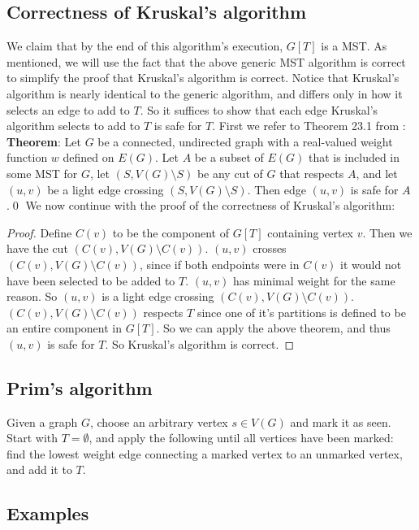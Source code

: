 \documentclass[11pt]{article}
\begin{document}
\subsection{Correctness of Kruskal's algorithm}
We claim that by the end of this algorithm's execution, $G[T]$ is a MST. As
mentioned, we will use the fact that the above generic MST algorithm is correct
to simplify the proof that Kruskal's algorithm is correct. Notice that
Kruskal's algorithm is nearly identical to the generic algorithm, and differs
only in how it selects an edge to add to $T$. So it suffices to show that each
edge Kruskal's algorithm selects to add to $T$ is safe for $T$. First we refer
to Theorem 23.1 from \cite{CLRS}:
\newline
\newline
\textbf{Theorem}: Let $G$ be a connected, undirected graph with a real-valued
weight function $w$ defined on $E(G)$. Let $A$ be a subset of $E(G)$ that is
included in some MST for $G$, let $(S,V(G)\setminus S)$ be any cut of $G$ that
respects $A$, and let $(u,v)$ be a light edge crossing $(S,V(G)\setminus S)$.
Then edge $(u,v)$ is safe for $A$.\qed
\newline
\newline
We now continue with the proof of the correctness of Kruskal's algorithm:
\begin{proof}
	Define $C(v)$ to be the component of $G[T]$ containing vertex $v$. Then we
	have the cut $(C(v),V(G)\setminus C(v))$. $(u,v)$ crosses
	$(C(v),V(G)\setminus C(v))$, since if both endpoints were in $C(v)$ it would
	not have been selected to be added to $T$. $(u,v)$ has minimal weight for
	the same reason. So $(u,v)$ is a light edge crossing
	$(C(v),V(G)\setminus C(v))$. $(C(v),V(G)\setminus C(v))$ respects $T$ since
	one of it's partitions is defined to be an entire component in $G[T]$. So
	we can apply the above theorem, and thus $(u,v)$ is safe for $T$. So
	Kruskal's algorithm is correct.\cite{CLRS}
\end{proof}


\subsection{Prim's algorithm}
Given a graph $G$, choose an arbitrary vertex $s\in V(G)$ and mark it as seen.
Start with $T=\emptyset$, and apply the following until all vertices have been
marked: find the lowest weight edge connecting a marked vertex to an unmarked
vertex, and add it to $T$.\cite{MST}


\subsection{Examples}
\begin{figure}[H]

\end{figure}
\begin{figure}[H]

\end{figure}
\begin{figure}[H]

\end{figure}
\end{document}
